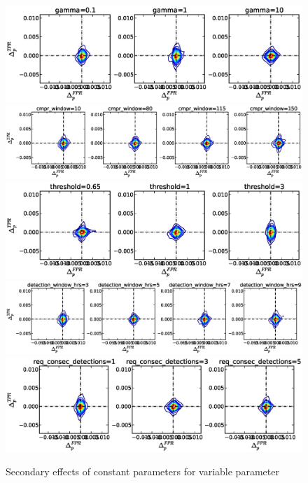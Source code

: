 \begin{figure}[!h]
\begin{center}
\includegraphics[width=6in]{../fig/final/delta_hist_sec/w_smooth/gamma}
\includegraphics[width=6in]{../fig/final/delta_hist_sec/w_smooth/cmpr_window}
\includegraphics[width=6in]{../fig/final/delta_hist_sec/w_smooth/threshold}
\includegraphics[width=6in]{../fig/final/delta_hist_sec/w_smooth/detection_window_hrs}
\includegraphics[width=6in]{../fig/final/delta_hist_sec/w_smooth/req_consec_detections}
\end{center}
\caption{\label{fig:delta_sec4} Secondary effects of constant parameters for variable parameter }
\end{figure}

